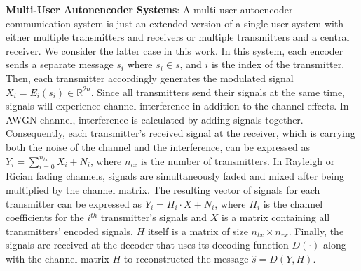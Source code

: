 \textbf{Multi-User Autonencoder Systems}: A multi-user autoencoder communication system is just an extended version of a single-user system with either multiple transmitters and receivers or multiple transmitters and a central receiver. We consider the latter case in this work. In this system, each encoder sends a separate message \(s_i\) where \(s_i \in s\), and \(i\) is the index of the transmitter. Then, each transmitter accordingly generates the modulated signal \(X_i = E_i(s_i) \in \mathbb{R}^{2n}\). Since all transmitters send their signals at the same time, signals will experience channel interference in addition to the channel effects. In AWGN channel, interference is calculated by adding signals together. Consequently, each transmitter's received signal at the receiver, which is carrying both the noise of the channel and the interference, can be expressed as \(Y_i = \sum_{i=0}^{n_{tx}}X_i + N_i\), where \(n_{tx}\) is the number of transmitters. In Rayleigh or Rician fading channels, signals are simultaneously faded and mixed after being multiplied by the channel matrix. The resulting vector of signals for each transmitter can be expressed as \(Y_i = H_i \cdot X + N_i\), where \(H_i\) is the channel coefficients for the \(i^{th}\) transmitter's signals and \(X\) is a matrix containing all transmitters' encoded signals. \(H\) itself is a matrix of size \(n_{tx} \times n_{rx}\). Finally, the signals are received at the decoder that uses its decoding function \(D(\cdot)\) along with the channel matrix \(H\) to reconstructed the message \(\hat{s} = D(Y, H)\).